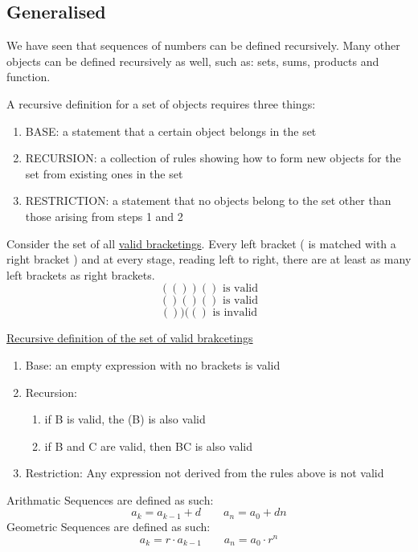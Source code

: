 \subsection{Generalised}
We have seen that sequences of numbers can be defined recursively. Many other objects can be defined recursively as well, such as: sets, sums, products and function.

A recursive definition for a set of objects requires three things:
\begin{enumerate}
    \item BASE: a statement that a certain object belongs in the set
    \item RECURSION: a collection of rules showing how to form new objects for the set from existing ones in the set
    \item RESTRICTION: a statement that no objects belong to the set other than those arising from steps 1 and 2
\end{enumerate}

\begin{example}
    Consider the set of all \underline{valid bracketings}. Every left bracket ( is matched with a right bracket ) and at every stage, reading left to right, there are at least as many left brackets as right brackets.
    $$(())()\text{ is valid}$$
    $$()()()\text{ is valid}$$
    $$())(()\text{ is invalid}$$

    \underline{Recursive definition of the set of valid brakcetings}
    \begin{enumerate}
        \item Base: an empty expression with no brackets is valid
        \item Recursion: \begin{enumerate}
            \item if B is valid, the (B) is also valid
            \item if B and C are valid, then BC is also valid
        \end{enumerate}
        \item Restriction: Any expression not derived from the rules above is not valid
    \end{enumerate}
\end{example}

\begin{definition}
    Arithmatic Sequences are defined as such:
    \[a_k = a_{k-1} + d \qquad a_n = a_0 +dn\]
    Geometric Sequences are defined as such:
    \[a_k = r\cdot a_{k-1} \qquad a_n = a_0\cdot r^n\]
\end{definition}


